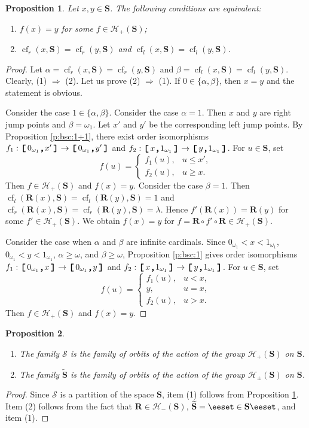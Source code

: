 \documentclass[preprint]{elsarticle}
\def\om{\omega}
\def\be{\beta}
\def\al{\alpha}
\def\la{\lambda}
\def\cH{\mathcal{H}}
\def\sset#1{\{#1\}}
\def\set#1{\bbset#1\eeset}
\def\bbset#1:#2\eeset{\{#1\,:\,#2\}}
\def\cS{{\mathcal S}}
\def\wt#1{\widetilde{#1}}
\newtheorem{proposition}{Proposition}[section]
\theoremstyle{definition}
\theoremstyle{remark}
\def\rarr{\Rightarrow}
\def\cf{\operatorname{cf}}
\def\ilcomma/{\boldsymbol{,}}
\def\ilsymlc{\boldsymbol{[}}
\def\ilsymrc{\boldsymbol{]}}
\def\ilfont#1{\boldsymbol{#1}}
\def\ilfontX#1{\mathrm{\text{\texttt{\textbf{\large #1}}}}}
\def\ilfontX#1{{\text{\texttt{\textbf{\large \upshape #1}}}}}
\def\ilfont#1{\raisebox{-1.2pt}{\ilfontX{#1}}}
\def\ilfontC#1{\raisebox{-0.7pt}{\ilfontX{#1}}}
\def\ilcomma/{\ilfontC{,}}
\def\ilsymlc{\ilfont{[}\,}
\def\ilsymrc{\,\ilfont{]}}
\def\ilcc[#1,#2]{\ilsymlc#1\ilcomma/ #2\ilsymrc}
\def\sS{\mathbf{S}}
\def\Rs{\mathbf{R}}
\def\wS{\wt\sS}
\def\oip#1{\cH_{+}(#1)}
\def\oim#1{\cH_{-}(#1)}
\def\oipm#1{\cH_{\pm}(#1)}
\def\mns{0_{\om_1}}
\def\mxs{1_{\om_1}}
\begin{document}
\begin{proposition}\label{p:bsc:2}
Let $x,y\in \sS$.
The following conditions are equivalent:
\begin{enumerate}
\item
$f(x)=y$ for some $f\in\oip\sS$;
\item
$\cf_r(x,\sS)=\cf_r(y,\sS)$ and
$\cf_l(x,\sS)=\cf_l(y,\sS)$.
\end{enumerate}
\end{proposition}
\begin{proof}
Let
$\al=\cf_r(x,\sS)=\cf_r(y,\sS)$ and
$\be = \cf_l(x,\sS)=\cf_l(y,\sS)$.
Clearly, (1) $\rarr$ (2). Let us prove (2) $\rarr$ (1).
If $0\in\sset{\al,\be}$, then $x=y$ and the statement is obvious.

Consider the case $1\in\sset{\al,\be}$. Consider the case $\al=1$. Then $x$ and $y$ are right jump points and $\be=\om_1$. Let $x'$ and $y'$ be the corresponding left jump points. By Proposition \ref{p:bsc:1+1}, there exist order isomorphisms $f_1: \ilcc[\mns,x']\to \ilcc[\mns,y']$ and $f_2: \ilcc[x,\mxs]\to \ilcc[y,\mxs]$. For $u\in \sS$, set
\[
f(u)=\begin{cases}
f_1(u), & u \leq x',
\\
f_2(u), & u \geq x.
\end{cases}
\]
Then $f\in\oip{\sS}$ and $f(x)=y$.
Consider the case $\be=1$. Then $\cf_l(\Rs(x),\sS)=\cf_l(\Rs(y),\sS)=1$ and $\cf_r(\Rs(x),\sS)=\cf_r(\Rs(y),\sS)=\la$. Hence $f'(\Rs(x))=\Rs(y)$ for some $f'\in \oip{\sS}$. We obtain $f(x)=y$ for $f=\Rs\circ f' \circ \Rs\in \oip\sS$.

Consider the case when $\al$ and $\be$ are infinite cardinals.
Since $\mns<x<\mxs$, $\mns<y<\mxs$, $\al\geq \om$, and $\be\geq \om$, Proposition \ref{p:bsc:1} gives order isomorphisms $f_1: \ilcc[\mns,x]\to \ilcc[\mns,y]$ and $f_2: \ilcc[x,\mxs]\to \ilcc[y,\mxs]$. For $u\in \sS$, set
\[
f(u)=\begin{cases}
f_1(u), & u < x,
\\
y, & u=x,
\\
f_2(u), & u > x.
\end{cases}
\]
Then $f\in\oip{\sS}$ and $f(x)=y$.
\end{proof}

\begin{proposition}\label{p:bsc:3}
\begin{enumerate}
\item
The family $\cS$
is the family of orbits of the action of the group $\oip\sS$ on $\sS$.
\item
The family $\wS$ is the family of orbits of the action of the group $\oipm\sS$ on $\sS$.
\end{enumerate}
\end{proposition}
\begin{proof}
Since $\cS$ is a partition of the space $\sS$, item (1) follows from Proposition \ref{p:bsc:2}.
Item (2) follows from the fact that $\Rs\in\oim\sS$, $\wS=\set{M\cup \Rs(M): M\in\sS}$, and item (1).
\end{proof}
\end{document}
